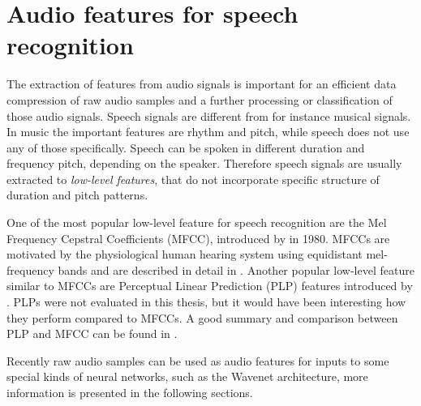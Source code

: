 
\section{Audio features for speech recognition}\label{sec:pref_features}
\thesisStateRevised
The extraction of features from audio signals is important for an efficient data compression of raw audio samples and a further processing or classification of those audio signals.
Speech signals are different from for instance musical signals.
In music the important features are rhythm and pitch, while speech does not use any of those specifically.
Speech can be spoken in different duration and frequency pitch, depending on the speaker.
Therefore speech signals are usually extracted to \emph{low-level features}, that do not incorporate specific structure of duration and pitch patterns.

One of the most popular low-level feature for speech recognition are the Mel Frequency Cepstral Coefficients (MFCC), introduced by \cite{Mermelstein1980} in 1980.
MFCCs are motivated by the physiological human hearing system using equidistant mel-frequency bands and are described in detail in .
Another popular low-level feature similar to MFCCs are Perceptual Linear Prediction (PLP) features introduced by \cite{Hermansky1987}.
PLPs were not evaluated in this thesis, but it would have been interesting how they perform compared to MFCCs.
A good summary and comparison between PLP and MFCC can be found in \cite{Hoenig2005}.

Recently raw audio samples can be used as audio features for inputs to some special kinds of neural networks, such as the Wavenet architecture, more information is presented in the following sections.
